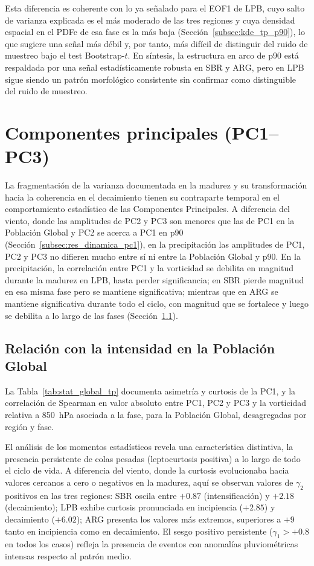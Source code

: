 Esta diferencia es coherente con lo ya señalado para el EOF1 de LPB, cuyo salto de varianza explicada es el más moderado de las tres regiones y cuya densidad espacial en el PDFe de esa fase es la más baja (Sección~\ref{subsec:kde_tp_p90}), lo que sugiere una señal más débil y, por tanto, más difícil de distinguir del ruido de muestreo bajo el test Bootstrap-$t$. En síntesis, la estructura en arco de p90 está respaldada por una señal estadísticamente robusta en SBR y ARG, pero en LPB sigue siendo un patrón morfológico consistente sin confirmar como distinguible del ruido de muestreo.

\section{Componentes principales (PC1--PC3)}\label{sec:dinamica_pc1_tp}

La fragmentación de la varianza documentada en la madurez y su transformación hacia la coherencia en el decaimiento tienen su contraparte temporal en el comportamiento estadístico de las Componentes Principales. A diferencia del viento, donde las amplitudes de PC2 y PC3 son menores que las de PC1 en la Población Global y PC2 se acerca a PC1 en p90 (Sección~\ref{subsec:res_dinamica_pc1}), en la precipitación las amplitudes de PC1, PC2 y PC3 no difieren mucho entre sí ni entre la Población Global y p90. En la precipitación, la correlación entre PC1 y la vorticidad se debilita en magnitud durante la madurez en LPB, hasta perder significancia; en SBR pierde magnitud en esa misma fase pero se mantiene significativa; mientras que en ARG se mantiene significativa durante todo el ciclo, con magnitud que se fortalece y luego se debilita a lo largo de las fases (Sección~\ref{subsec:pc1_global_tp}).



\subsection{Relación con la intensidad en la Población Global}\label{subsec:pc1_global_tp}

La Tabla~\ref{tab:stat_global_tp} documenta asimetría y curtosis de la PC1, y la correlación de Spearman en valor absoluto entre PC1, PC2 y PC3 y la vorticidad relativa a 850~hPa asociada a la fase, para la Población Global, desagregadas por región y fase.

El análisis de los momentos estadísticos revela una característica distintiva, la presencia persistente de colas pesadas (leptocurtosis positiva) a lo largo de todo el ciclo de vida. A diferencia del viento, donde la curtosis evolucionaba hacia valores cercanos a cero o negativos en la madurez, aquí se observan valores de $\gamma_2$ positivos en las tres regiones: SBR oscila entre $+0.87$ (intensificación) y $+2.18$ (decaimiento); LPB exhibe curtosis pronunciada en incipiencia ($+2.85$) y decaimiento ($+6.02$); ARG presenta los valores más extremos, superiores a $+9$ tanto en incipiencia como en decaimiento. El sesgo positivo persistente ($\gamma_1 > +0.8$ en todos los casos) refleja la presencia de eventos con anomalías pluviométricas intensas respecto al patrón medio.

